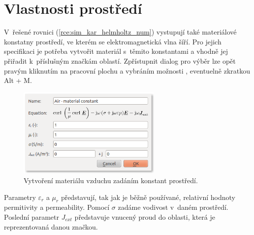 \section{Vlastnosti prostředí}
V~řešené rovnici (\ref{rce:sim_kar_helmholtz_num}) vystupují také materiálové konstatny prostředí, ve kterém se elektromagnetická vlna šíří. Pro jejich specifikaci je potřeba vytvořit materiál s~těmito konstantami a vhodně jej přiřadit k~příslušným značkám oblastí. Zpřístupnit dialog pro výběr lze opět pravým kliknutím na pracovní plochu a vybráním možnosti , eventuelně zkratkou Alt + M. 
\begin{figure}[!h]
	\centering
	\includegraphics[width=7cm]{sim_material.png}
	\caption{Vytvoření materiálu vzduchu zadáním konstant prostředí.}
	\label{obr:sim_material}
\end{figure}
Parametry $\varepsilon_r$ a $\mu_r$ představují, tak jak je běžně používané, relativní hodnoty permitivity a permeability. Pomocí $\sigma$ zadáme vodivost v~daném prostředí. Poslední parametr $J_{ext}$ představuje vnucený proud do oblasti, která je reprezentovaná danou značkou.

